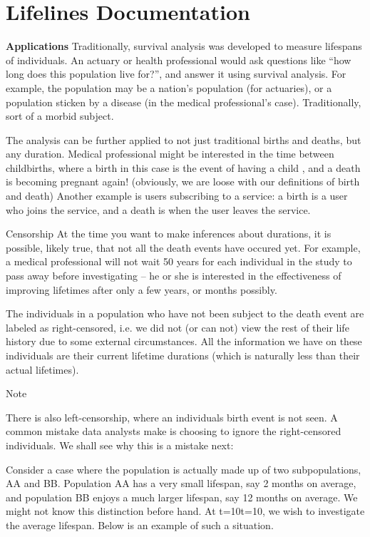 \documentclass{beamer}
\begin{document}
\section{Lifelines Documentation}
\begin{frame}
\noindent \textbf{Applications}
Traditionally, survival analysis was developed to measure lifespans of individuals. An actuary or health professional would ask questions like “how long does this population live for?”, and answer it using survival analysis. For example, the population may be a nation’s population (for actuaries), or a population sticken by a disease (in the medical professional’s case). Traditionally, sort of a morbid subject.
\end{frame}
\begin{frame}
The analysis can be further applied to not just traditional births and deaths, but any duration. Medical professional might be interested in the time between childbirths, where a birth in this case is the event of having a child , and a death is becoming pregnant again! (obviously, we are loose with our definitions of birth and death) Another example is users subscribing to a service: a birth is a user who joins the service, and a death is when the user leaves the service.
\end{frame}
\begin{frame}
Censorship
At the time you want to make inferences about durations, it is possible, likely true, that not all the death events have occured yet. For example, a medical professional will not wait 50 years for each individual in the study to pass away before investigating – he or she is interested in the effectiveness of improving lifetimes after only a few years, or months possibly.
\end{frame}
\begin{frame}
The individuals in a population who have not been subject to the death event are labeled as right-censored, i.e. we did not (or can not) view the rest of their life history due to some external circumstances. All the information we have on these individuals are their current lifetime durations (which is naturally less than their actual lifetimes).

Note

There is also left-censorship, where an individuals birth event is not seen.
A common mistake data analysts make is choosing to ignore the right-censored individuals. We shall see why this is a mistake next:
\end{frame}
\begin{frame}
Consider a case where the population is actually made up of two subpopulations, AA and BB. Population AA has a very small lifespan, say 2 months on average, and population BB enjoys a much larger lifespan, say 12 months on average. We might not know this distinction before hand. At t=10t=10, we wish to investigate the average lifespan. Below is an example of such a situation.
\end{frame}	
\end{document}
